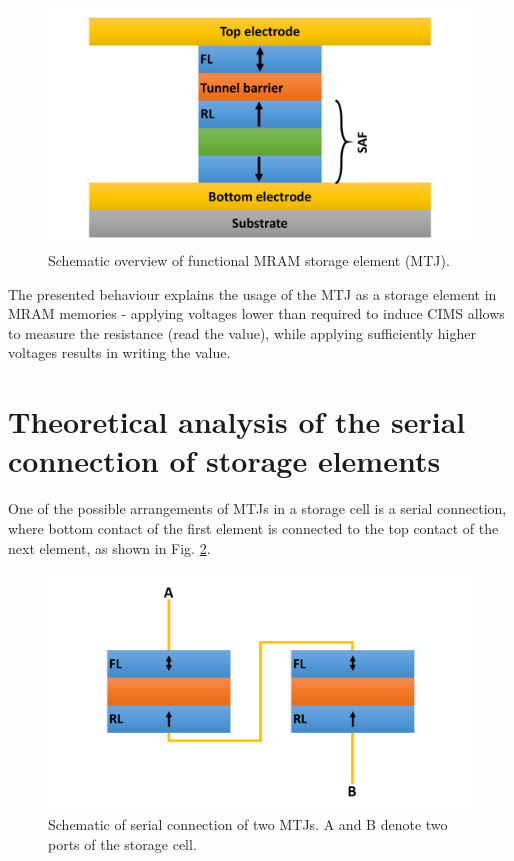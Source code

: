     \begin{figure}[H]
        \centering
        \includegraphics[width=0.75\paperwidth, page=1]{img/03/MTJ_summary.pdf}
        \caption{Schematic overview of functional MRAM storage element (MTJ).}
        \label{PrinciplesMTJsum}
    \end{figure}    
    
    The presented behaviour explains the usage of the MTJ as a storage element in MRAM memories - applying voltages lower than required to induce CIMS allows to measure the resistance (read the value), while applying sufficiently higher voltages results in writing the value.
    
\section{Theoretical analysis of the serial connection of storage elements} \label{sec:PrinciplesSerial}

	One of the possible arrangements of MTJs in a storage cell is a serial connection, where bottom contact of the first element is connected to the top contact of the next element, as shown in Fig. \ref{PrinciplesSeriesCon}.
	
	\begin{figure}[H]
        \centering
        \includegraphics[width=0.75\paperwidth, page=1]{img/03/Series.pdf}
        \caption{Schematic of serial connection of two MTJs. A and B denote two ports of the storage cell.}
        \label{PrinciplesSeriesCon}
    \end{figure}
    
